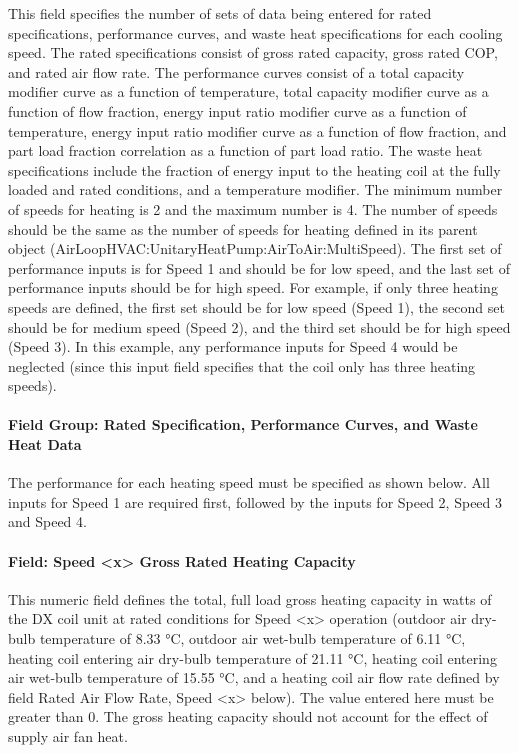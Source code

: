 This field specifies the number of sets of data being entered for rated specifications, performance curves, and waste heat specifications for each cooling speed. The rated specifications consist of gross rated capacity, gross rated COP, and rated air flow rate. The performance curves consist of a total capacity modifier curve as a function of temperature, total capacity modifier curve as a function of flow fraction, energy input ratio modifier curve as a function of temperature, energy input ratio modifier curve as a function of flow fraction, and part load fraction correlation as a function of part load ratio. The waste heat specifications include the fraction of energy input to the heating coil at the fully loaded and rated conditions, and a temperature modifier. The minimum number of speeds for heating is 2 and the maximum number is 4. The number of speeds should be the same as the number of speeds for heating defined in its parent object (AirLoopHVAC:UnitaryHeatPump:AirToAir:MultiSpeed). The first set of performance inputs is for Speed 1 and should be for low speed, and the last set of performance inputs should be for high speed. For example, if only three heating speeds are defined, the first set should be for low speed (Speed 1), the second set should be for medium speed (Speed 2), and the third set should be for high speed (Speed 3). In this example, any performance inputs for Speed 4 would be neglected (since this input field specifies that the coil only has three heating speeds).

\paragraph{Field Group: Rated Specification, Performance Curves, and Waste Heat Data}\label{field-group-rated-specification-performance-curves-and-waste-heat-data}

The performance for each heating speed must be specified as shown below. All inputs for Speed 1 are required first, followed by the inputs for Speed 2, Speed 3 and Speed 4.

\paragraph{Field: Speed \textless{}x\textgreater{} Gross Rated Heating Capacity}\label{field-speed-x-gross-rated-heating-capacity}

This numeric field defines the total, full load gross heating capacity in watts of the DX coil unit at rated conditions for Speed \textless{}x\textgreater{} operation (outdoor air dry-bulb temperature of 8.33 °C, outdoor air wet-bulb temperature of 6.11 °C, heating coil entering air dry-bulb temperature of 21.11 °C, heating coil entering air wet-bulb temperature of 15.55 °C, and a heating coil air flow rate defined by field Rated Air Flow Rate, Speed \textless{}x\textgreater{} below). The value entered here must be greater than 0. The gross heating capacity should not account for the effect of supply air fan heat.

